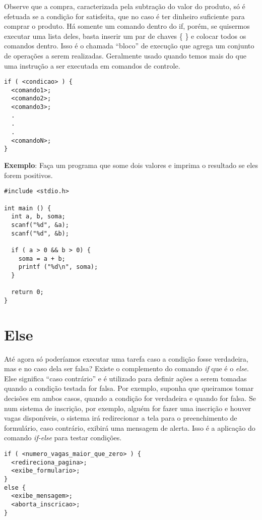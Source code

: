 Observe que a compra, caracterizada pela subtração do valor do produto, só é efetuada se a condição for satisfeita, que no caso é ter dinheiro suficiente para comprar o produto.
Há somente um comando dentro do if, porém, se quisermos executar uma lista deles, basta inserir um par de chaves \{ \} e colocar todos os comandos dentro. Isso é o chamada ``bloco'' de execução que agrega um conjunto de operações a serem realizadas. Geralmente usado quando temos mais do que uma instrução a ser executada em comandos de controle.

\begin{lstlisting}[label=comandoIf,caption=Exemplo múltiplos comandos]
if ( <condicao> ) {
  <comando1>;
  <comando2>;
  <comando3>;
  .
  .
  .
  <comandoN>;
}
\end{lstlisting}

\textbf{Exemplo}:
  Faça um programa que some dois valores e imprima o resultado se eles forem positivos.

\begin{lstlisting}[label=comandoIf,caption=Exemplo múltiplos comandos]
#include <stdio.h>

int main () {
  int a, b, soma;
  scanf("%d", &a);  
  scanf("%d", &b);
  
  if ( a > 0 && b > 0) {
    soma = a + b;
    printf ("%d\n", soma);
  }
  
  return 0;
}
\end{lstlisting}

\section{Else}
Até agora só poderíamos executar uma tarefa caso a condição fosse verdadeira, mas e no caso dela ser falsa? Existe o complemento do comando \textit{if} que é o \textit{else}. Else significa ``caso contrário'' e é utilizado para definir ações a serem tomadas quando a condição testada for falsa.
Por exemplo, suponha que queiramos tomar decisões em ambos casos, quando a condição for verdadeira e quando for falsa. Se num sistema de inscrição, por exemplo, alguém for fazer uma inscrição e houver vagas disponíveis, o sistema irá redirecionar a tela para o preenchimento de formulário, caso contrário, exibirá uma mensagem de alerta. Isso é a aplicação do comando \textit{if-else} para testar condições.

\begin{lstlisting}[label=comandoIf,caption=Exemplo com else]
if ( <numero_vagas_maior_que_zero> ) {
  <redireciona_pagina>;
  <exibe_formulario>;
}
else {
  <exibe_mensagem>;
  <aborta_inscricao>;
}
\end{lstlisting}

